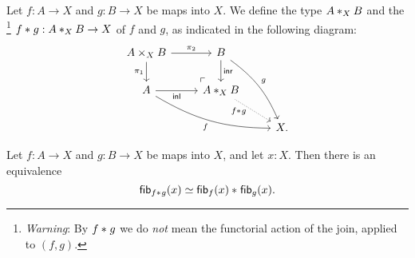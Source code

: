 \begin{defn}
Let $f:A\to X$ and $g:B\to X$ be maps into $X$. We define the type $\join[X]{A}{B}$ and the \footnote{\emph{Warning}: By $\join{f}{g}$ we do \emph{not} mean the functorial action of the
join, applied to $(f,g)$.} $\join{f}{g}:\join[X]{A}{B}\to X$ of
$f$ and $g$, as indicated in the following diagram:
\begin{equation*}
\begin{tikzcd}
A\times_X B \arrow[r,"\pi_2"] \arrow[d,swap,"\pi_1"] \arrow[dr, phantom, "{\ulcorner}", at end] & B \arrow[d,"\inr"] \arrow[ddr,bend left=15,"g"] \\
A \arrow[r,swap,"\inl"] \arrow[drr,bend right=15,swap,"f"] & \join[X]{A}{B} \arrow[dr,densely dotted,swap,near start,"\join{f}{g}" xshift=1ex] \\
& & X.
\end{tikzcd}
\end{equation*}
\end{defn}

\begin{thm}\label{defn:join-fiber}
Let $f:A\to X$ and $g:B\to X$ be maps into $X$, and let $x:X$. Then there is
an equivalence
\begin{equation*}
\eqv{\fib{\join{f}{g}}{x}}{\join{\fib{f}{x}}{\fib{g}{x}}}.
\end{equation*}
\end{thm}

